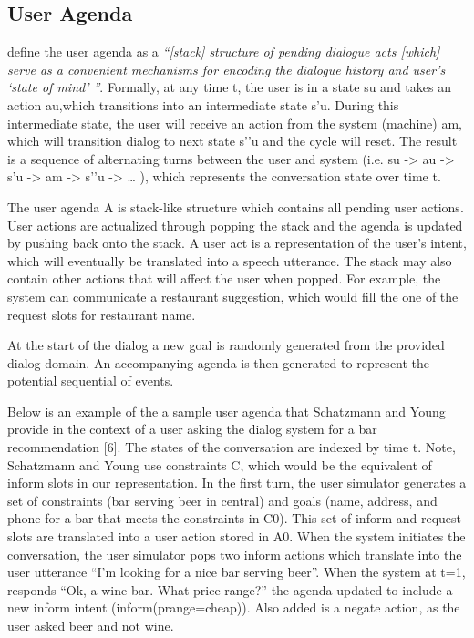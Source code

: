 \subsection{User Agenda} 

\cite{Schatzmann2009TheHA} define the user agenda as a \textit{“[stack] structure of pending dialogue acts [which] serve as a convenient mechanisms for encoding the dialogue history and user’s ‘state of mind’ ”}. Formally, at any time t, the user is in a state su  and takes an action au,which transitions into an intermediate state s’u. During this intermediate state, the user will receive an action from the system (machine) am, which will transition dialog to next state s’’u and the cycle will reset. The result is a sequence of alternating turns between the user and system (i.e. su -> au -> s’u -> am -> s’’u -> … ), which represents the conversation state over time t.
 
The user agenda A is stack-like structure which contains all pending user actions. User actions are actualized through popping the stack and the agenda is updated by pushing back onto the stack. A user act is a representation of the user’s intent, which will eventually be translated into a speech utterance. The stack may also contain other actions that will affect the user when popped. For example, the system can communicate a restaurant suggestion, which would fill the one of the request slots for restaurant name.  

At the start of the dialog a new goal is randomly generated from the provided dialog domain. An accompanying agenda is then generated to represent the potential sequential of events. 

Below is an  example of the a sample user agenda that Schatzmann and Young provide in the context of a user asking the dialog system for a bar recommendation [6]. The states of the conversation are indexed by time t. Note, Schatzmann and Young use constraints C, which would be the equivalent of inform slots in our representation. In the first turn, the user simulator generates a set of constraints (bar serving beer in central) and goals (name, address, and phone for a bar that meets the constraints in C0). This set of inform and request slots are translated into a user action stored in A0. When the system initiates the conversation, the user simulator pops two inform actions which translate into the user utterance “I’m looking for a nice bar serving beer”. When the system at t=1, responds “Ok, a wine bar. What price range?” the agenda updated to include a new inform intent (inform(prange=cheap)). Also added is a negate action, as the user asked beer and not wine. 

